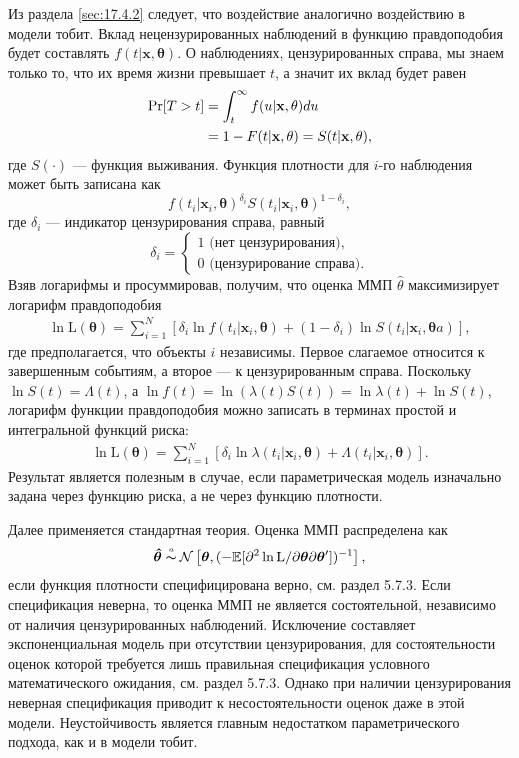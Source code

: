 Из раздела \ref{sec:17.4.2} следует, что воздействие аналогично воздействию в модели тобит. Вклад нецензурированных наблюдений в функцию правдоподобия будет составлять $f(t|\mathbf{x},\mathbf{\theta})$. О наблюдениях, цензурированных справа, мы знаем только то, что их время жизни превышает $t$, а значит их вклад будет равен
        \begin{align}
        \Pr[T>t]&=\int^{\infty}_{t}f(u|\mathbf{x},\mathbf{\theta})du\notag\\
                &=1-F(t|\mathbf{x},\theta)=S(t|\mathbf{x},\mathbf{\theta}),\notag
        \end{align}
где $S(\cdot)$ --- функция выживания. Функция плотности для $i$-го наблюдения может быть записана как
    $$f(t_i|\mathbf{x}_i,\mathbf{\theta})^{\delta_i}S(t_i|\mathbf{x}_i,\mathbf{\theta})^{1-\delta_i},$$
где $\delta_i$ --- индикатор цензурирования справа, равный
        $$\delta_i=\begin{cases}
            1 \textrm{ (нет цензурирования)},\\
            0 \textrm{ (цензурирование справа)}.
                   \end{cases}$$
Взяв логарифмы и просуммировав, получим, что  оценка ММП $\hat{\theta}$ максимизирует логарифм правдоподобия
        \begin{align}
        \label{eq:17.17}
        \ln \mathrm{L}(\mathbf{\theta})=\sum^{N}_{i=1}[\delta_i\ln f(t_i|\mathbf{x}_i,\mathbf{\theta})+(1-\delta_i)\ln S(t_i|\mathbf{x}_i,\mathbf{\theta}a)],
        \end{align}
где предполагается, что объекты $i$ независимы. Первое слагаемое относится к завершенным событиям, а второе --- к цензурированным справа. Поскольку $\ln S(t) = \Lambda(t)$, а $\ln f(t) = \ln(\lambda(t)S(t)) = \ln \lambda(t) + \ln S(t)$, логарифм функции правдоподобия можно записать в терминах простой и интегральной функций риска:
        \begin{align}
        \label{eq:17.18}
        \ln \mathrm{L}(\mathbf{\theta})=\sum^{N}_{i=1}[\delta_i\ln\lambda(t_i|\mathbf{x}_i,\mathbf{\theta})+\Lambda(t_i|\mathbf{x}_i,
        \mathbf{\theta})].
        \end{align}
Результат является полезным в случае, если параметрическая модель изначально задана через функцию риска, а не через функцию плотности.

Далее применяется стандартная теория. Оценка ММП распределена как
$$\bm{\hat{\theta}}\thicksim\!\!\!\!\!^{{}^{a}}\hspace{0.1cm}\mathcal{N}\left[\bm{\theta},(-\E[\partial^2\ln\mathrm{L}/\partial\bm{\theta}\partial\bm{\theta}'])^{-1} \right],$$
если функция плотности специфицирована верно, см. раздел 5.7.3. %
Если спецификация неверна, то оценка ММП не является состоятельной, независимо от наличия цензурированных наблюдений. Исключение составляет экспоненциальная модель при отсутствии цензурирования, для состоятельности оценок которой требуется лишь правильная спецификация условного математического ожидания, см. раздел 5.7.3. %
Однако при наличии цензурирования неверная спецификация приводит к несостоятельности оценок даже в этой модели. Неустойчивость является главным недостатком параметрического подхода, как и в модели тобит.

